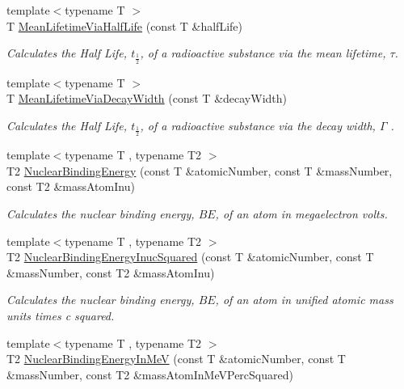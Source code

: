 \begin{DoxyCompactItemize}
{\footnotesize template$<$typename T $>$ }\\T \mbox{\hyperlink{group___e_g_x_phys-_mean_lifetime_ga2586e148263e1f6c8ff89f269a0930ea}{Mean\+Lifetime\+Via\+Half\+Life}} (const T \&half\+Life)
\begin{DoxyCompactList}\small\item\em Calculates the Half Life, $t_{\frac{1}{2}}$, of a radioactive substance via the mean lifetime, $\tau$. \end{DoxyCompactList}\item 
{\footnotesize template$<$typename T $>$ }\\T \mbox{\hyperlink{group___e_g_x_phys-_mean_lifetime_ga8a1dda4168b4b25db93bf1ae7832fd7e}{Mean\+Lifetime\+Via\+Decay\+Width}} (const T \&decay\+Width)
\begin{DoxyCompactList}\small\item\em Calculates the Half Life, $t_{\frac{1}{2}}$, of a radioactive substance via the decay width, $\Gamma$ . \end{DoxyCompactList}\item 
{\footnotesize template$<$typename T , typename T2 $>$ }\\T2 \mbox{\hyperlink{group___e_g_x_phys-_nuclear_binding_energy_gab6832bf15ead7b4e867e759e0a2a078e}{Nuclear\+Binding\+Energy}} (const T \&atomic\+Number, const T \&mass\+Number, const T2 \&mass\+Atom\+Inu)
\begin{DoxyCompactList}\small\item\em Calculates the nuclear binding energy, $BE$, of an atom in megaelectron volts. \end{DoxyCompactList}\item 
{\footnotesize template$<$typename T , typename T2 $>$ }\\T2 \mbox{\hyperlink{group___e_g_x_phys-_nuclear_binding_energy_gafeed0fb7220e4900a8da011ed9fca44f}{Nuclear\+Binding\+Energy\+Inuc\+Squared}} (const T \&atomic\+Number, const T \&mass\+Number, const T2 \&mass\+Atom\+Inu)
\begin{DoxyCompactList}\small\item\em Calculates the nuclear binding energy, $BE$, of an atom in unified atomic mass units times c squared. \end{DoxyCompactList}\item 
{\footnotesize template$<$typename T , typename T2 $>$ }\\T2 \mbox{\hyperlink{group___e_g_x_phys-_nuclear_binding_energy_ga25f5d2d32fad7e28e278cf8b5ea8ffa8}{Nuclear\+Binding\+Energy\+In\+MeV}} (const T \&atomic\+Number, const T \&mass\+Number, const T2 \&mass\+Atom\+In\+Me\+V\+Perc\+Squared)

\end{DoxyCompactItemize}
